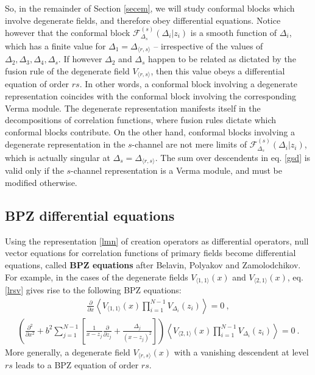 \documentclass[12pt,a4paper,notitlepage]{report}
\numberwithin{equation}{section}
\theoremstyle{break}
\begin{document}
So, in the remainder of Section \ref{secem}, we will study conformal blocks which involve degenerate fields, and therefore obey differential equations. 
Notice however that the conformal block $\mathcal{F}^{(s)}_{\Delta_s}(\Delta_i|z_i)$ is a smooth function of $\Delta_i$, which has a finite value for $\Delta_1 = \Delta_{\langle r,s\rangle}$ -- irrespective of the values of $\Delta_2,\Delta_3,\Delta_4,\Delta_s$. 
If however $\Delta_2$ and $\Delta_s$ happen to be related as dictated by the fusion rule of the degenerate field $V_{\langle r,s\rangle}$, then this value obeys a differential equation of order $rs$.
In other words, a conformal block involving a degenerate representation coincides with the conformal block involving the corresponding Verma module.
The degenerate representation manifests itself in the decompositions of correlation functions, where fusion rules dictate which conformal blocks contribute.
On the other hand, conformal blocks involving a degenerate representation in the $s$-channel are not mere limits of $\mathcal{F}^{(s)}_{\Delta_s}(\Delta_i|z_i)$, which is actually singular at $\Delta_s = \Delta_{\langle r,s\rangle}$.
The sum over descendents in eq. \eqref{gsd} is valid only if the $s$-channel representation is a Verma module, and must be modified otherwise. 

\subsection{BPZ differential equations \label{secbpz}}

Using the representation \eqref{lmn} of creation operators as differential operators, null vector equations for correlation functions of primary fields become differential equations, called \textbf{\boldmath BPZ equations} after Belavin, Polyakov and Zamolodchikov. 
For example, in the cases of the degenerate fields $V_{\langle 1,1 \rangle}(x)$ and $V_{\langle 2,1 \rangle}(x)$, eq. \eqref{lrsv} gives rise to the following BPZ equations: 
\begin{align}
 {\frac{\partial}{\partial x}} \left\langle V_{\langle 1,1 \rangle}(x) \prod_{i=1}^{N-1} V_{\Delta_i}(z_i) \right\rangle = 0 \ ,
\label{pvoo} 
\end{align}
\begin{align}
\boxed{\left( \frac{\partial^2}{\partial x^2}  +b^2 \sum_{j=1}^{N-1} \left[\frac{1}{x-z_j}{\frac{\partial}{\partial z_j}}+ \frac{\Delta_j}{(x-z_j)^2} \right]\right)\left\langle V_{\langle 2,1 \rangle}(x) \prod_{i=1}^{N-1} V_{\Delta_i}(z_i) \right\rangle = 0} \ .
\label{pvot}
\end{align}
More generally, a degenerate field $V_{\langle r,s \rangle}(x)$ with a vanishing descendent at level $rs$ leads to a BPZ equation of order $rs$. 
\end{document}

